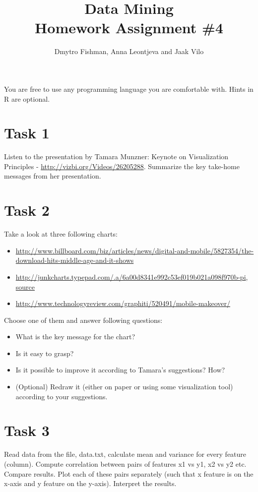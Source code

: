 \documentclass{article}
\title{Data Mining\\Homework Assignment \#4} %
\author{Dmytro Fishman, Anna Leontjeva and Jaak Vilo} %
\begin{document}
\maketitle %

You are free to use any programming language you are comfortable with. Hints in R are optional. 

\section*{Task 1}
Listen to the presentation by Tamara Munzner: Keynote on Visualization Principles - \url{http://vizbi.org/Videos/26205288}. Summarize the key take-home messages from her presentation.

\section*{Task 2}
Take a look at three following charts:
\begin{itemize}
\item \url{http://www.billboard.com/biz/articles/news/digital-and-mobile/5827354/the-download-hits-middle-age-and-it-shows}
\item \url{http://junkcharts.typepad.com/.a/6a00d8341e992c53ef019b021a098f970b-pi}, \href{http://www.scientificamerican.com/article/the-truth-about-chinas-patent-boom/}{source}
\item \url{http://www.technologyreview.com/graphiti/520491/mobile-makeover/}
\end{itemize}

Choose one of them and answer following questions:
\begin{itemize}
\item What is the key message for the chart?
\item Is it easy to grasp?
\item Is it possible to improve it according to Tamara's suggestions? How?
\item (Optional) Redraw it (either on paper or using some visualization tool) according to your suggestions.
\end{itemize} 

\section*{Task 3}
Read data from the file, data.txt, calculate mean and variance for every feature (column). Compute correlation between pairs of features x1 vs y1, x2 vs y2 etc. Compare results. Plot each of these pairs separately (such that x feature is on the x-axis and y feature on the y-axis). Interpret the results. %
\end{document}
